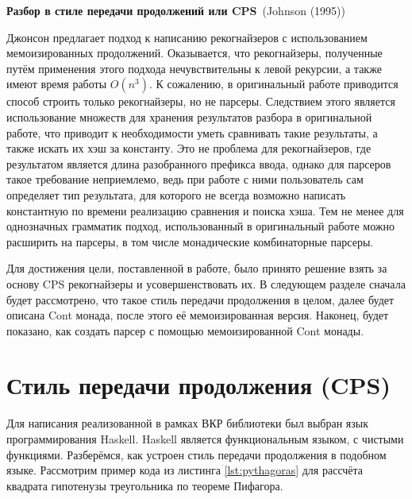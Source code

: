 \documentclass[times]{itmo-student-thesis}
\begin{document}
\textbf{Разбор в стиле передачи продолжений или CPS}~(Johnson (1995)\cite{johnson_memoization_nodate})

Джонсон предлагает подход к написанию рекогнайзеров с использованием мемоизированных продолжений. Оказывается, что
рекогнайзеры, полученные путём	применения этого подхода нечувствительны к левой рекурсии, а также имеют время работы
$O(n^3)$. К сожалению, в оригинальный работе приводится способ строить только рекогнайзеры, но не парсеры.
Следствием этого является использование множеств для хранения результатов разбора в оригинальной работе, что приводит к
необходимости уметь сравнивать такие результаты, а также искать их хэш за константу. Это не проблема для рекогнайзеров,
где результатом является длина разобранного префикса ввода, однако для парсеров такое требование неприемлемо, ведь при
работе с ними пользователь сам определяет тип результата, для которого не всегда возможно написать константную по
времени реализацию сравнения и поиска хэша. Тем не менее для однозначных грамматик подход, использованный в
оригинальный работе можно расширить на парсеры, в том числе монадические комбинаторные парсеры.

Для достижения цели, поставленной в работе, было принято решение взять за основу CPS рекогнайзеры и усовершенствовать их.
В следующем разделе сначала будет рассмотрено, что такое стиль передачи продолжения в целом, далее будет описана Cont монада,
после этого её мемоизированная версия. Наконец, будет показано, как создать парсер с помощью мемоизированной Cont монады.



\section{Стиль передачи продолжения (CPS)}\label{sec:cps}

Для написания реализованной в рамках ВКР библиотеки был выбран язык программирования Haskell. Haskell является функциональным языком, 
с чистыми функциями. Разберёмся, как устроен стиль передачи продолжения в подобном языке. Рассмотрим пример кода из листинга 
\ref{lst:pythagoras} для рассчёта квадрата гипотенузы треугольника\cite{noauthor_haskellcontinuation_nodate} по теореме Пифагора.
\end{document}
